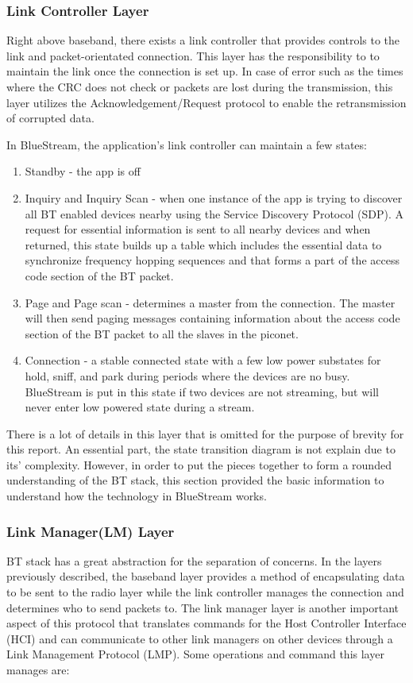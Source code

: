 \documentclass[a4paper,12pt]{article}
\begin{document}
\subsubsection{Link Controller Layer}
Right above baseband, there exists a link controller that provides controls to the link and packet-orientated connection. This layer has the responsibility to to maintain the link once the connection is set up. In case of error such as the times where the CRC does not check or packets are lost during the transmission, this layer utilizes the Acknowledgement/Request protocol to enable the retransmission of corrupted data. 

In BlueStream, the application’s link controller can maintain a few states:

\begin{enumerate}
\item Standby - the app is off
\item Inquiry and Inquiry Scan - when one instance of the app is trying to discover all BT enabled devices nearby using the Service Discovery Protocol (SDP). A request for essential information is sent to all nearby devices and when returned, this state builds up a table which includes the essential data to synchronize frequency hopping sequences and that forms a part of the access code section of the BT packet. 
\item Page and Page scan - determines a master from the connection. The master will then send paging messages containing information about the access code section of the BT packet to all the slaves in the piconet. 
\item Connection - a stable connected state with a few low power substates for hold, sniff, and park during periods where the devices are no busy. BlueStream is put in this state if two devices are not streaming, but will never enter low powered state during a stream. 
\end{enumerate}

There is a lot of details in this layer that is omitted for the purpose of brevity for this report. An essential part, the state transition diagram is not explain due to its’ complexity. However, in order to put the pieces together to form a rounded understanding of the BT stack, this section provided the basic information to understand how the technology in BlueStream works.

\subsubsection{Link Manager(LM) Layer}
BT stack has a great abstraction for the separation of concerns. In the layers previously described, the baseband layer provides a method of encapsulating data to be sent to the radio layer while the link controller manages the connection and determines who to send packets to. The link manager layer is another important aspect of this protocol that translates commands for  the Host Controller Interface (HCI) and can communicate to other link managers on other devices through a Link Management Protocol (LMP). Some operations and command this layer manages are:
\end{document}
